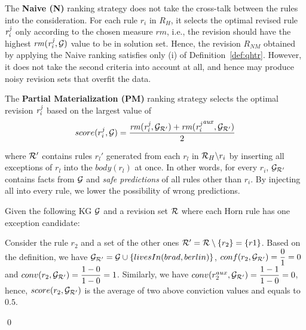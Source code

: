 The \textbf{Naive (N)} ranking strategy does not take the cross-talk between the rules into the consideration. For each rule $r_i$ in $R_H$, it selects the optimal revised rule $\mathit{r^j_i}$ only according to the chosen measure $rm$, i.e., the revision should have the highest $\mathit{rm(r^j_{i},\mathcal{G})}$ value to be in solution set. Hence, the revision $R_{NM}$ obtained by applying the Naive ranking satisfies only (i) of Definition~\ref{def:qhtr}. However, it does not take the second criteria into account at all, and hence may produce noisy revision sets that overfit the data.

The \textbf{Partial Materialization (PM)} ranking strategy selects the optimal revision $\mathit{r^j_i}$ based on the largest value of
\begin{equation}
\label{pm}
score(r^j_i,\mathcal{G})=\dfrac{\mathit{rm(r^j_i,\mathcal{G}_{\mathcal{R}'})+rm({r^j_i}^{aux},\mathcal{G}_{\mathcal{R}'})}}{2}
\end{equation}

where $\mathcal{R}'$ contains rules $r_l'$ generated from each $r_l$ in $\mathcal{R}_H\backslash r_i$ by inserting all exceptions of $r_l$ into the $body(r_l)$ at once. In other words, for every $r_i$, $\mathcal{G}_{\mathcal{R}'}$ contains facts from $\mathcal{G}$ and \textit{safe predictions} of all rules other than $r_i$. By injecting all into every rule, we lower the possibility of wrong predictions.

\begin{example}\label{ex:as}
Given the following KG $\mathcal{G}$ and a revision set $\mathcal{R}$ where each Horn rule has one exception candidate:\\
{\small {}}
{\small {}}            
\normalsize
{\smallskip

\noindent            

Consider the rule $r_2$ and a set of the other ones $\mathcal{R}' = \mathcal{R} \setminus \{r_2\} = \{r1\}$. Based on the definition, we have $\mathcal{G}_{\mathcal{R}'} = \mathcal{G} \cup \{livesIn(brad,berlin)\}$, $conf(r_2, \mathcal{G}_{\mathcal{R}'}) = \dfrac{0}{1} = 0$ and $conv(r_2, \mathcal{G}_{\mathcal{R}'}) = \dfrac{1 - 0}{1 - 0} = 1$. Similarly, we have $conv(r_2^{aux}, \mathcal{G}_{\mathcal{R}'}) = \dfrac{1 - 1}{1 - 0} = 0$, hence, $score(r_2, \mathcal{G}_{\mathcal{R}'})$ is the average of two above conviction values and equals to $0.5$.
}\qed
\end{example}

